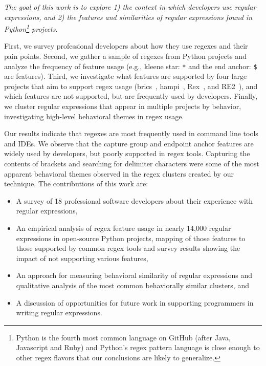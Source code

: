 \emph{The goal of this work is to explore 1) the context in which developers use regular expressions, and 2) the features and similarities of  regular expressions found in Python\footnote{Python is the fourth most common language on GitHub (after Java, Javascript and Ruby) and  Python's regex pattern language is close enough to other regex flavors that our conclusions are likely to generalize.} projects}. 

First, we survey professional developers about how they use regexes and their pain points.  Second, we gather a sample of regexes from Python projects and analyze the frequency of feature usage (e.g., kleene star: \verb!*! and the end anchor: \verb!$! are features).    Third, we investigate what features are supported by four large projects that aim to support regex usage (brics~\cite{brics}, hampi~\cite{hampi}, Rex~\cite{rex}, and RE2~\cite{re2}), and which features are not supported, but are frequently used by developers.  Finally, we cluster regular expressions that appear in multiple projects by behavior, investigating high-level behavioral themes in regex usage. 

Our results indicate that regexes are most frequently used in command line tools and IDEs.  We observe that the capture group and endpoint anchor features are widely used by developers, but poorly supported in regex tools.  Capturing the contents of brackets and searching for delimiter characters were some of the most apparent  behavioral themes observed in the regex clusters created by our technique.
The contributions of this work are:
\begin{itemize}
    \item A survey of 18 professional software developers about their experience with regular expressions,
	\item An empirical analysis of regex feature usage in nearly 14,000 regular expressions in  open-source Python projects, mapping of those features to those supported by common regex tools and survey results showing the impact of not supporting various features,
	\item An approach for measuring behavioral similarity of regular expressions and qualitative analysis of the most common behaviorally similar clusters, and
	\item A discussion of opportunities for future work in supporting programmers in writing regular expressions.
\end{itemize}

